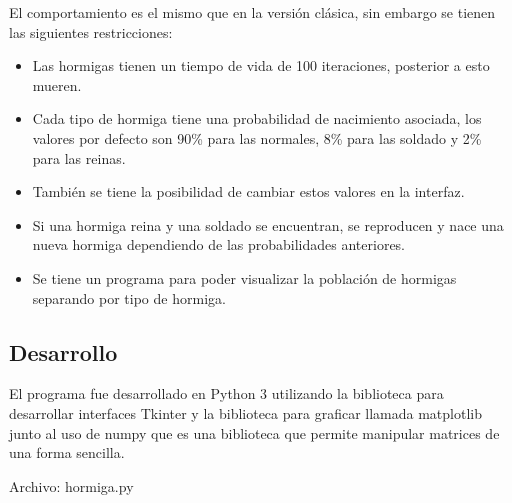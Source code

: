 El comportamiento es el mismo que en la versión clásica, sin embargo se tienen las siguientes restricciones:
\begin{itemize}
 \item Las hormigas tienen un tiempo de vida de 100 iteraciones, posterior a esto mueren.
 \item Cada tipo de hormiga tiene una probabilidad de nacimiento asociada, los valores por defecto son 90\% para las normales, 8\% para las soldado y 2\% para las reinas.
 \item También se tiene la posibilidad de cambiar estos valores en la interfaz.
 \item Si una hormiga reina y una soldado se encuentran, se reproducen y nace una nueva hormiga dependiendo de las probabilidades anteriores.
 \item Se tiene un programa para poder visualizar la población de hormigas separando por tipo de hormiga.
\end{itemize}


\subsection{Desarrollo}
El programa fue desarrollado en Python 3 utilizando la biblioteca para desarrollar interfaces Tkinter y la biblioteca para graficar llamada matplotlib junto al uso de numpy que es una biblioteca que permite manipular matrices de una forma sencilla.

Archivo: hormiga.py

